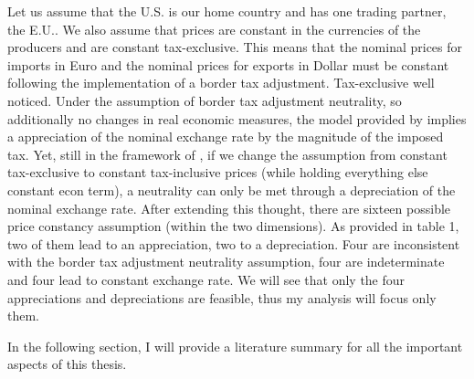 Let us assume that the U.S. is our home country and has one trading partner, the E.U.. We also assume that prices are constant in the currencies of the producers and are constant tax-exclusive. This means that the nominal prices for imports in Euro and the nominal prices for exports in Dollar must be constant following the implementation of a border tax adjustment. Tax-exclusive well noticed. Under the assumption of border tax adjustment neutrality, so additionally no changes in real economic measures, the model provided by \cite{buiter2017exchange} implies a appreciation of the nominal exchange rate by the magnitude of the imposed tax. Yet, still in the framework of \cite{buiter2017exchange}, if we change the assumption from constant tax-exclusive to constant tax-inclusive prices (while holding everything else constant econ term), a neutrality can only be met through a depreciation of the nominal exchange rate. 
After extending this thought, there are sixteen possible price constancy assumption (within the two dimensions). As provided in table 1, two of them lead to an appreciation, two to a depreciation. Four are inconsistent with the border tax adjustment neutrality assumption, four are indeterminate and four lead to constant exchange rate. We will see that only the four appreciations and depreciations are feasible, thus my analysis will focus only them. 


In the following section, I will provide a literature summary for all the important aspects of this thesis. \\

